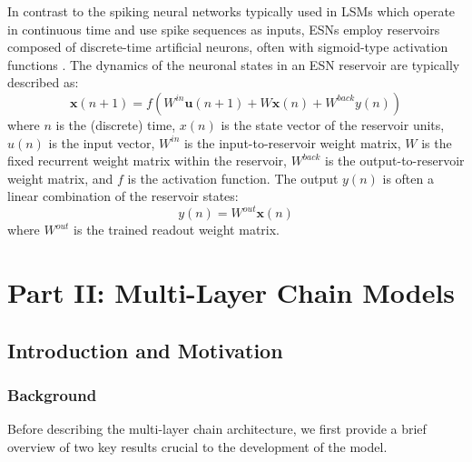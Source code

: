 \documentclass[a4paper,12pt]{report}
\begin{document}
In contrast to the spiking neural networks typically used in LSMs which operate in 
continuous time and use spike sequences as inputs, ESNs employ reservoirs 
composed of discrete-time artificial neurons, often with sigmoid-type activation 
functions \cite{Melandri2014}. The dynamics of the neuronal states in an ESN reservoir 
are typically described as:
\begin{equation}
  \mathbf{x}(n+1) = f(W^{in}\mathbf{u}(n+1) + W\mathbf{x}(n) + W^{back}y(n))
\end{equation}
where $n$ is the (discrete) time, $x(n)$ is the state vector of the reservoir units, 
$u(n)$ is the input vector, $W^{in}$ is the input-to-reservoir weight matrix, 
$W$ is the fixed recurrent weight matrix within the reservoir, $W^{back}$ is the output-to-reservoir
weight matrix, and $f$ is the activation function. The output $y(n)$ is often a 
linear combination of the reservoir states:
\begin{equation}
  y(n) = W^{out}\mathbf{x}(n)
\end{equation}
where $W^{out}$ is the trained readout weight matrix.





\part*{Part II: Multi-Layer Chain Models}

\chapter{Introduction and Motivation}

\section{Background}
Before describing the multi-layer chain architecture, we first provide a brief overview of two key
results crucial to the development of the model.
\end{document}
